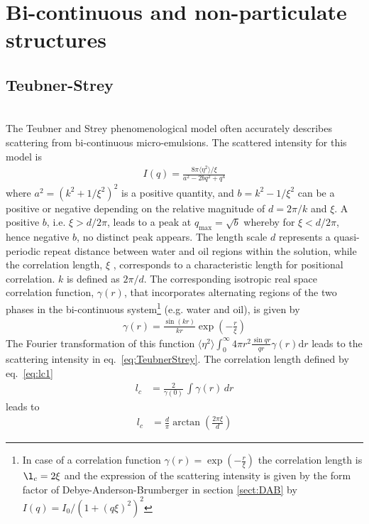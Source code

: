 \section{Bi-continuous and non-particulate structures}
\subsection{Teubner-Strey}
\label{sect:TeubnerStrey}~\\

The Teubner and Strey \cite{TeubnerStrey87,StreyKlineKaler1994,Sottmann1997}
phenomenological model often accurately describes scattering from
bi-continuous micro-emulsions. The scattered intensity for this
model is
\begin{align}
I(q) = \frac{8\pi\langle\eta^2\rangle/\xi}{a^2-2bq^2+q^4}
\label{eq:TeubnerStrey}
\end{align}
where $a^2=(k^2+1/\xi^2)^2$ is a positive quantity, and
$b=k^2-1/\xi^2$ can be a positive or negative depending on the
relative magnitude of $d=2\pi/k$ and $\xi$. A positive $b$, i.e.
$\xi>d/2\pi$, leads to a peak at $q_\text{max}=\sqrt{b}$ whereby for
$\xi<d/2\pi$, hence negative $b$, no distinct peak appears. The
length scale $d$ represents a quasi-periodic repeat distance between
water and oil regions within the solution, while the correlation
length, $\xi$ , corresponds to a characteristic length for
positional correlation. $k$ is defined as $2\pi/d$. The
corresponding isotropic real space correlation function,
$\gamma(r)$, that incorporates alternating regions of the two phases
in the bi-continuous system\footnote{
In case of a correlation function $\gamma(r)=\exp\left(-\frac{r}{\xi} \right)$
the correlation length is $\l_c=2\xi$ and the expression of the scattering intensity is given by the form factor of
Debye-Anderson-Brumberger in section \ref{sect:DAB} by $I(q)=I_0/(1+(q\xi)^2)^2$}
(e.g. water and oil), is given by
\begin{align}
\gamma(r) = \frac{\sin(kr)}{kr} \exp\left(-\frac{r}{\xi} \right)
\end{align}
The Fourier transformation of this function
$\langle\eta^2\rangle \int_0^\infty 4\pi r^2 \frac{\sin qr}{qr}\gamma(r)\mathrm{d}r$
leads to the scattering intensity in eq.\ \ref{eq:TeubnerStrey}.
The correlation length defined by eq.\ \ref{eq:lc1}
\begin{align}
l_c &= \frac{2}{\gamma(0)}\, \int \gamma(r) \, dr
\end{align}
leads to
\begin{align}
l_c &= \frac{d}{\pi} \arctan\left(\frac{2 \pi  \xi }{d}\right)
\label{eq:lcTS}
\end{align}
